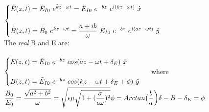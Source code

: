 \documentclass[fleqn]{article}
\begin{document}
\begin{enumerate}
\begin{enumerate}
      \textcolor{hwColor}{
        \\
        $
          \begin{cases}
            \tilde{E}(z,t)=\tilde{E}_{I0} ~ e^{\tilde{k}z-\omega t}
            =\tilde{E}_{I0} ~ e^{-bz} ~ e^{i(kz-\omega t)} ~ \hat{x}
            \\
            \\
            \tilde{B}(z,t)=\tilde{B}_0 ~ e^{\tilde{k}z-\omega t}
            =\dfrac{a+ib}{\omega} ~ \tilde{E}_{I0} ~ e^{-bz} ~ e^{i(az-\omega t)} ~ \hat{y}
          \end{cases}
          \\
          \\
        $
        \\
        The \emph{real} B and E are:
        \\
        \\
        $
          \begin{cases}
            E(z,t)=\tilde{E}_{I0} ~ e^{-bz} ~ cos(az-\omega t+\delta_E) ~ \hat{x}
            \\
            \\
            B(z,t)=\tilde{E}_{I0} ~ e^{-bz} ~ cos(kz-\omega t+\delta_E+\phi) ~ \hat{y}
          \end{cases}
          \\
          \\
          \\
        $
        where 
        $
          \\
          \\
          \dfrac{B_0}{E_0}=\dfrac{\sqrt{a^2+b^2}}{\omega}=\sqrt{\epsilon \mu \sqrt{1+(\dfrac{\sigma}{\epsilon \omega})^2}}
          \\
          \\
          \\
          \phi=Arctan\big( \dfrac{b}{a} \bigg)
          \\
          \\
          \\
          \delta-B-\delta_E=\phi
          \\
          \\
        $
      }

    \end{enumerate}

  \end{enumerate}
\end{document}
